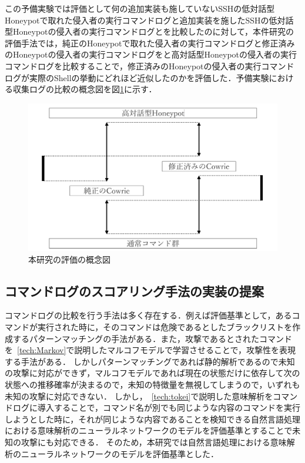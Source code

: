 この予備実験では評価として何の追加実装も施していないSSHの低対話型Honeypotで取れた侵入者の実行コマンドログと追加実装を施したSSHの低対話型Honeypotの侵入者の実行コマンドログとを比較したのに対して，本件研究の評価手法では，純正のHoneypotで取れた侵入者の実行コマンドログと修正済みのHoneypotの侵入者の実行コマンドログをと高対話型Honeypotの侵入者の実行コマンドログを比較することで，修正済みのHoneypotの侵入者の実行コマンドログが実際のShellの挙動にどれほど近似したのかを評価した．予備実験における収集ログの比較の概念図を図\ref{fig:gainen}に示す．

\begin{figure}[htbp]
    \centering
    \includegraphics[width=1.0\textwidth]{figures/sotuhyoka.png}
    \caption{本研究の評価の概念図}
    \label{fig:gainen}
\end{figure}



\subsection{コマンドログのスコアリング手法の実装の提案}
\label{eval:implsuge}
コマンドログの比較を行う手法は多く存在する．例えば評価基準として，あるコマンドが実行された時に，そのコマンドは危険であるとしたブラックリストを作成するパターンマッチングの手法がある．また，攻撃であるとされたコマンドを~\ref{tech:Markov}で説明したマルコフモデルで学習させることで，攻撃性を表現する手法がある．
しかしパターンマッチングであれば静的解析であるので未知の攻撃に対応ができず，マルコフモデルであれば現在の状態だけに依存して次の状態への推移確率が決まるので，未知の特徴量を無視してしまうので，いずれも未知の攻撃に対応できない．
しかし，~\ref{tech:tokei}で説明した意味解析をコマンドログに導入することで，コマンド名が別でも同じような内容のコマンドを実行しようとした時に，それが同じような内容であることを検知できる自然言語処理における意味解析のニューラルネットワークのモデルを評価基準とすることで未知の攻撃にも対応できる．
そのため，本研究では自然言語処理における意味解析のニューラルネットワークのモデルを評価基準とした．

